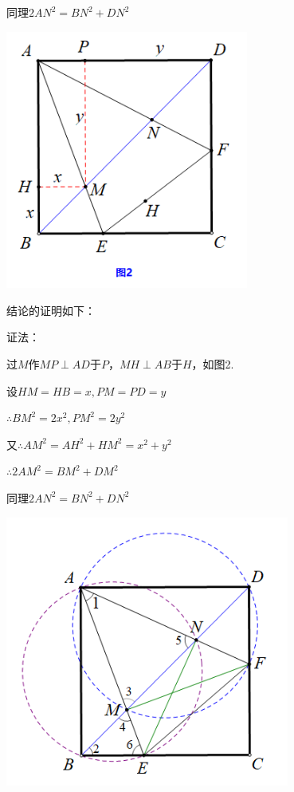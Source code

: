 {\begin{minipage}[h]{0.6\textwidth}
同理$2AN^2=BN^2+DN^2$		
\end{minipage}
\quad
\begin{minipage}[h]{0.4\textwidth}
	\centering
	\includegraphics[width=0.6\textwidth]{figure/banjiao15}
\end{minipage}
}

结论的证明如下：

\begin{minipage}[h]{0.6\textwidth}
	证法：
	
	过$M$作$MP \perp AD$于$P$，$MH \perp AB$于$H$，如图2.
	
	设$HM=HB=x,PM=PD=y$
	
	$\therefore BM^2=2x^2,PM^2=2y^2$
	
	又$\therefore AM^2=AH^2+HM^2=x^2+y^2$
	
	$\therefore 2AM^2=BM^2+DM^2$
	
	同理$2AN^2=BN^2+DN^2$		
\end{minipage}
\quad
\begin{minipage}[h]{0.4\textwidth}
	\centering
	\includegraphics[width=0.7\textwidth]{figure/banjiao16}
\end{minipage}



